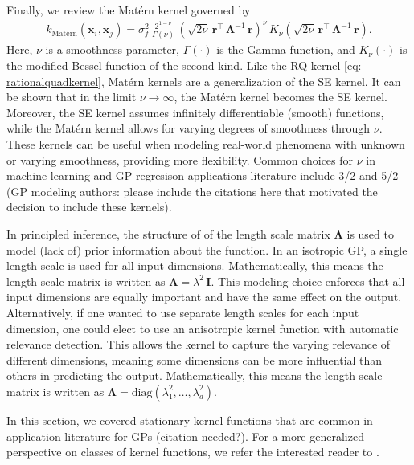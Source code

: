 \documentclass[journal=jacsat,manuscript=article]{achemso}
\newcommand{\alltodo}[1]{{\color{cyan} (#1)}}
\newcommand{\xvec}{\ensuremath{\mathbf{x}}}
\begin{document}
{Finally, we review the Mat\'ern kernel governed by
\begin{gather}
    k_{\text{Mat\'ern}}(\xvec_i,\xvec_j) = \sigma_f^2 \,\frac{2^{1-\nu}}{\Gamma(\nu)} \, \left(\sqrt{2\nu} \, \mathbf{r}^\intercal \,\boldsymbol{\Lambda}^{-1} \,\mathbf{r} \right)^{\nu}\, K_\nu  \left(\sqrt{2\nu} \, \mathbf{r}^\intercal \,\boldsymbol{\Lambda}^{-1} \,\mathbf{r} \right). \label{eq: maternkern}
\end{gather}
Here, $\nu$ is a smoothness parameter, $\Gamma(\cdot)$ is the Gamma function, and $K_\nu(\cdot)$ is the modified Bessel function of the second kind. Like the RQ kernel \eqref{eq: rationalquadkernel}, Matérn kernels are a generalization of the SE kernel. It can be shown that in the limit $\nu \rightarrow \infty$, the Mat\'ern kernel becomes the SE kernel. Moreover, the SE kernel assumes infinitely differentiable (smooth) functions, while the Matérn kernel allows for varying degrees of smoothness through $\nu$. These kernels can be useful when modeling real-world phenomena with unknown or varying smoothness, providing more flexibility. Common choices for $\nu$ in machine learning and GP regresison applications literature include 3/2 and 5/2 \alltodo{GP modeling authors: please include the citations here that motivated the decision to include these kernels}. 

In principled inference, the structure of of the length scale matrix $\boldsymbol{\Lambda}$ is used to model (lack of) prior information about the function. In an isotropic GP, a single length scale is used for all input dimensions. Mathematically, this means the length scale matrix is written as $\boldsymbol{\Lambda} = \lambda^2 \, \mathbf{I}$. This modeling choice enforces that all input dimensions are equally important and have the same effect on the output. Alternatively, if one wanted to use separate length scales for each input dimension, one could elect to use an anisotropic kernel function with automatic relevance detection. This allows the kernel to capture the varying relevance of different dimensions, meaning some dimensions can be more influential than others in predicting the output. Mathematically, this means the length scale matrix is written as $\boldsymbol{\Lambda} = \text{diag}(\lambda_1^2,\dots,\lambda_d^2)$.

In this section, we covered stationary kernel functions that are common in application literature for GPs \alltodo{citation needed?}. For a more generalized perspective on classes of kernel functions, we refer the interested reader to \citeauthor{Genton} \cite{Genton}.

}
\end{document}
